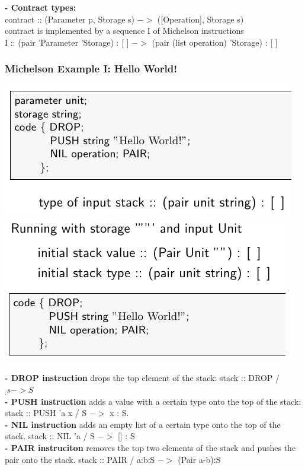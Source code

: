 \documentclass{article}
\begin{document}
\textbf{- Contract types: }\\
contract :: (Parameter p, Storage s) $->$ ([Operation], Storage s)\\
contract is implemented by a sequence I of Michelson instructions\\
I :: (pair ’Parameter ’Storage) : [ ] $->$ (pair (list operation) ’Storage) : [ ]

\subsubsection{Michelson Example I: Hello World!}
\includegraphics[scale=0.4]{58.png}
\includegraphics[scale=0.4]{57.png}\\\\
\textbf{- DROP instruction} drops the top element of the stack: stack :: DROP / $_: s -> S$\\
\textbf{- PUSH instruction} adds a value with a certain type onto the top of the stack: stack :: PUSH 'a x / S $->$ x : S.\\
\textbf{- NIL instruction} adds an empty list of a certain type onto the top of the stack. stack :: NIL 'a / S $->$ [] : S\\
\textbf{- PAIR instruciton} removes the top two elements of the stack and pushes the pair onto the stack. stack :: PAIR / a:b:S $->$ (Pair a-b):S \\\\
\end{document}
